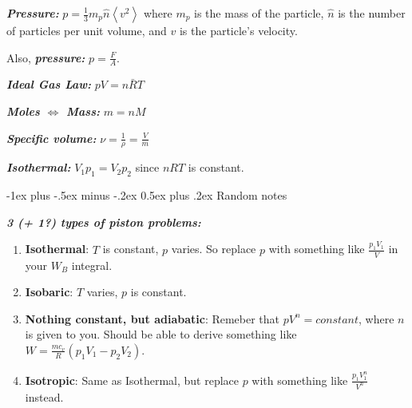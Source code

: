 \documentclass[10pt,landscape,letterpaper]{article}
\makeatletter
\renewcommand{\subsection}{\@startsection{subsection}{2}{0mm}%
                                {-1ex plus -.5ex minus -.2ex}%
                                {0.5ex plus .2ex}%
                                {\normalfont\normalsize\bfseries}}
\newcommand{\fsheetlabel}[1]{\textcolor{FSheetLabelColor}{\textbf{\textit{#1}}}}
\makeatother
\begin{document}
\begin{multicols*}{3}
\begin{minipage}{\columnwidth}
        \fsheetlabel{Pressure:} $p=\frac{1}{3} m_p \hat{n} \left\langle v^2 \right\rangle$ where $m_p$ is the mass of the particle, $\hat{n}$ is the number of particles per unit volume, and $v$ is the particle's velocity.
        
        Also, \fsheetlabel{pressure:} $p=\frac{F}{A}$.
        
        \fsheetlabel{Ideal Gas Law:} $pV=n\bar{R}T$
        
        \fsheetlabel{Moles $\Leftrightarrow$ Mass:} $m = nM$
        
        \fsheetlabel{Specific volume:} $\nu = \frac{1}{\rho} = \frac{V}{m}$
        
        \fsheetlabel{Isothermal:} $V_1 p_1 = V_2 p_2$ since $nRT$ is constant.
    \end{minipage}
    \vspace{2ex plus .5ex minus .5ex}
    
    \begin{minipage}{\columnwidth}\raggedright
        \subsection{Random notes}
        
        \fsheetlabel{3 (+ 1?) types of piston problems:}
        
        \begin{enumerate}
            \item \textbf{Isothermal}: $T$ is constant, $p$ varies. So replace $p$ with something like $\frac{p_1 V_1}{V}$ in your $W_B$ integral.
            \item \textbf{Isobaric}: $T$ varies, $p$ is constant.
            \item \textbf{Nothing constant, but adiabatic}: Remeber that $pV^n = constant$, where $n$ is given to you. Should be able to derive something like $W = \frac{m c_v}{R}(p_1 V_1 - p_2 V_2)$.
            \item \textbf{Isotropic}: Same as Isothermal, but replace $p$ with something like $\frac{p_1 V_1^n}{V^n}$ instead.
        \end{enumerate}
    \end{minipage}
    \vspace{2ex plus .5ex minus .5ex}
    
    \begin{minipage}{\columnwidth}\raggedright

\end{minipage}
\end{multicols*}
\end{document}
